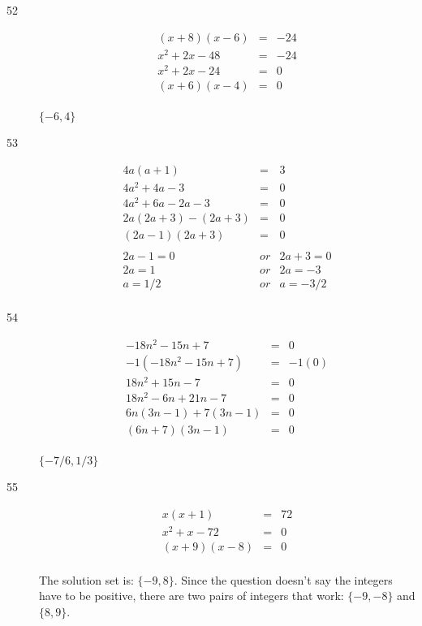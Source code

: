 \documentclass[fleqn,addpoints]{exam}
\begin{document}
\begin{description}
\item[52]
\begin{eqnarray*}
  (x + 8)(x - 6) &=& -24 \\
  x^2 + 2x - 48 &=& -24 \\
  x^2 + 2x - 24 &=& 0 \\
  (x + 6)(x - 4) &=& 0 \\
\end{eqnarray*}

$\{-6, 4\}$

\item[53]
\begin{eqnarray*}
  4a(a + 1) &=& 3  \\
  4a^2 + 4a - 3 &=& 0 \\
  4a^2 + 6a - 2a - 3 &=& 0 \\
  2a(2a + 3) - (2a + 3) &=& 0 \\
  (2a - 1)(2a + 3) &=& 0 \\
  \\
  2a - 1 = 0 &or& 2a + 3 = 0 \\
  2a = 1 &or& 2a = -3 \\
  a = 1/2 &or& a = -3/2 \\
\end{eqnarray*}

\item[54]
\begin{eqnarray*}
  -18n^2 - 15n + 7 &=& 0 \\
  -1(-18n^2 - 15n + 7) &=& -1(0) \\
  18n^2 + 15n - 7 &=& 0 \\
  18n^2 -6n + 21n - 7 &=& 0 \\
  6n(3n - 1) + 7(3n - 1) &=& 0 \\
  (6n + 7)(3n - 1) &=& 0 \\
\end{eqnarray*}

$\{-7/6, 1/3\}$

\item[55]
\begin{eqnarray*}
  x(x + 1) &=& 72 \\
  x^2 + x - 72 &=& 0 \\
  (x + 9)(x - 8) &=& 0 \\
\end{eqnarray*}

The solution set is: $\{-9, 8\}$.  Since the question doesn't say the integers have to be positive, there are two pairs of integers that work: $\{-9, -8\}$ and $\{8, 9\}$.


\end{description}
\end{document}
